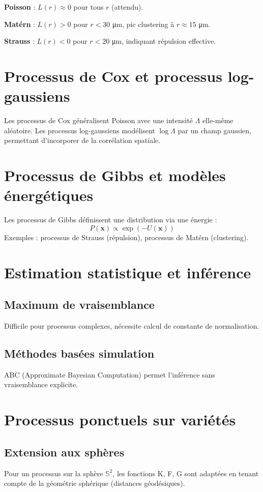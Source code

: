 \textbf{Poisson} : $L(r) \approx 0$ pour tous $r$ (attendu).

\textbf{Matérn} : $L(r) > 0$ pour $r < 30$ μm, pic clustering à $r \approx 15$ μm.

\textbf{Strauss} : $L(r) < 0$ pour $r < 20$ μm, indiquant répulsion effective.

\section{Processus de Cox et processus log-gaussiens}

Les processus de Cox généralisent Poisson avec une intensité $\Lambda$ elle-même aléatoire. Les processus log-gaussiens modélisent $\log \Lambda$ par un champ gaussien, permettant d'incorporer de la corrélation spatiale.

\section{Processus de Gibbs et modèles énergétiques}

Les processus de Gibbs définissent une distribution via une énergie :
\[
P(\mathbf{x}) \propto \exp(-U(\mathbf{x}))
\]
Exemples : processus de Strauss (répulsion), processus de Matérn (clustering).

\section{Estimation statistique et inférence}

\subsection{Maximum de vraisemblance}
Difficile pour processus complexes, nécessite calcul de constante de normalisation.

\subsection{Méthodes basées simulation}
ABC (Approximate Bayesian Computation) permet l'inférence sans vraisemblance explicite.

\section{Processus ponctuels sur variétés}

\subsection{Extension aux sphères}
Pour un processus sur la sphère $\mathbb{S}^2$, les fonctions K, F, G sont adaptées en tenant compte de la géométrie sphérique (distances géodésiques).

